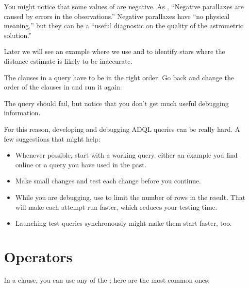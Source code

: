 \documentclass[letterpaper,10pt,english]{sphinxmanual}
\begin{document}
You might notice that some values of  are negative.  As , “Negative parallaxes are caused by errors in the observations.”  Negative parallaxes have “no physical meaning,” but they can be a “useful diagnostic on the quality of the astrometric solution.”

Later we will see an example where we use  and  to identify stars where the distance estimate is likely to be inaccurate.

 The clauses in a query have to be in the right order.  Go back and change the order of the clauses in  and run it again.

The query should fail, but notice that you don’t get much useful debugging information.

For this reason, developing and debugging ADQL queries can be really hard.  A few suggestions that might help:
\begin{itemize}
\item {} 
Whenever possible, start with a working query, either an example you find online or a query you have used in the past.

\item {} 
Make small changes and test each change before you continue.

\item {} 
While you are debugging, use  to limit the number of rows in the result.  That will make each attempt run faster, which reduces your testing time.

\item {} 
Launching test queries synchronously might make them start faster, too.

\end{itemize}


\section{Operators}
\label{\detokenize{01_query:operators}}
In a  clause, you can use any of the ; here are the most common ones:
\end{document}
